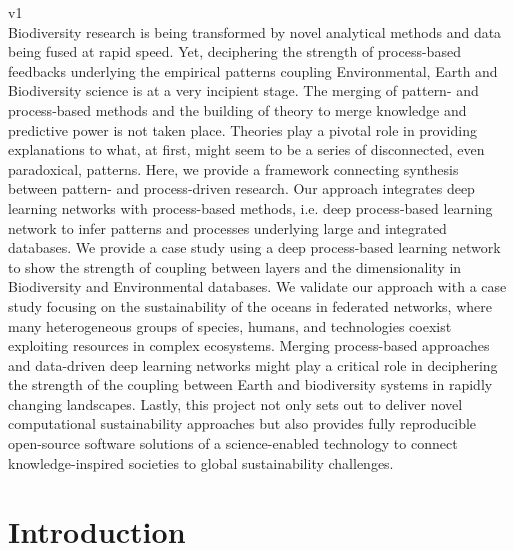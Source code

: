 \documentclass[12pt,a4paper]{article}
\begin{document}
v1\\
Biodiversity research is being transformed
by novel analytical methods and data being fused at rapid
speed. Yet, deciphering the strength of process-based feedbacks
underlying the empirical patterns coupling Environmental, Earth and
Biodiversity science is at a very
incipient stage. The merging of pattern- and process-based methods and the building
of theory to merge knowledge and predictive power is not taken
place. Theories play a pivotal role in providing explanations to
what, at first, might seem to be a series of disconnected, even
paradoxical, patterns. Here, we provide a framework connecting
synthesis between pattern- and process-driven research. Our approach
integrates deep learning networks with process-based methods, i.e. deep
process-based learning network to infer patterns and processes
underlying large and integrated databases. We provide a case study
using a deep process-based learning network to show the strength of
coupling between layers and the dimensionality in Biodiversity and
Environmental databases. We validate our approach with a case study focusing on the sustainability of the oceans in federated networks, where many heterogeneous groups of species, humans, and technologies coexist exploiting resources in complex ecosystems. Merging process-based approaches and
data-driven deep learning networks might play a critical role in
deciphering the strength of the coupling between Earth and
biodiversity systems in rapidly changing landscapes. Lastly, this project not only sets out to deliver novel computational sustainability approaches but also provides fully reproducible open-source software solutions of a science-enabled technology to connect knowledge-inspired societies to global sustainability challenges.

\newpage

\section{Introduction}
\end{document}
